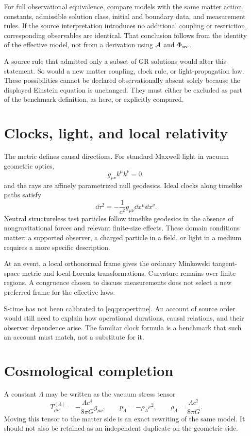 \documentclass[11pt]{article}
\begin{document}
For full observational equivalence, compare models with the same matter action, constants, admissible solution class, initial and boundary data, and measurement rules. If the source interpretation introduces no additional coupling or restriction, corresponding observables are identical. That conclusion follows from the identity of the effective model, not from a derivation using $\mathcal A$ and $\Phi_{\mathrm{src}}$.

A source rule that admitted only a subset of GR solutions would alter this statement. So would a new matter coupling, clock rule, or light-propagation law. These possibilities cannot be declared observationally absent solely because the displayed Einstein equation is unchanged. They must either be excluded as part of the benchmark definition, as here, or explicitly compared.

\section{Clocks, light, and local relativity}
The metric defines causal directions. For standard Maxwell light in vacuum geometric optics,
\begin{equation}
g_{\mu\nu}k^\mu k^\nu=0,
\label{eq:null}
\end{equation}
and the rays are affinely parametrized null geodesics. Ideal clocks along timelike paths satisfy
\begin{equation}
\dd\tau^2=-\frac1{c^2}g_{\mu\nu}\dd x^\mu\dd x^\nu.
\label{eq:propertime}
\end{equation}
Neutral structureless test particles follow timelike geodesics in the absence of nongravitational forces and relevant finite-size effects. These domain conditions matter: a supported observer, a charged particle in a field, or light in a medium requires a more specific description.

At an event, a local orthonormal frame gives the ordinary Minkowski tangent-space metric and local Lorentz transformations. Curvature remains over finite regions. A congruence chosen to discuss measurements does not select a new preferred frame for the effective laws.

S-time has not been calibrated to \eqref{eq:propertime}. An account of source order would still need to explain how operational durations, causal relations, and their observer dependence arise. The familiar clock formula is a benchmark that such an account must match, not a substitute for it.

\section{Cosmological completion}
A constant $\Lambda$ may be written as the vacuum stress tensor
\begin{equation}
T^{(\Lambda)}_{\mu\nu}=-\frac{\Lambda c^4}{8\pi G}g_{\mu\nu},
\qquad p_\Lambda=-\rho_\Lambda c^2,
\qquad \rho_\Lambda=\frac{\Lambda c^2}{8\pi G}.
\label{eq:de_sector_note}
\end{equation}
Moving this tensor to the matter side is an exact rewriting of the same model. It should not also be retained as an independent duplicate on the geometric side.
\end{document}
